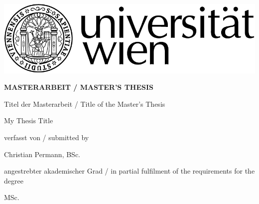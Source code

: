 \begin{titlepage}
\vspace*{-2cm}  %
\begin{flushright}
	\includegraphics[width=.5\textwidth]{titlepage/RZ_Logo_Uni_sw_01.jpg}
\end{flushright}
\vspace{1cm}

\begin{center}  %
    \huge{\textbf{\textsf{\MakeUppercase{
        MASTERARBEIT / MASTER'S THESIS
    }}}}
    \vspace{2cm}

    \large{\textsf{  %
        Titel der Masterarbeit / Title of the Master's Thesis
    }}
    \vspace{.1cm}

    \LARGE{\textsf{  %
        {\glqq}My Thesis Title\grqq
    }}
    \vspace{2cm}

    \large{\textsf{  %
        verfasst von / submitted by
    }}

    \Large{\textsf{  %
        Christian Permann, BSc.
    }}
    \vspace{2cm}

    \large{\textsf{
        angestrebter akademischer Grad / in partial fulfilment of the requirements for the degree  %
    }}

    \Large{\textsf{  %
				MSc.
    }}
\end{center}
\vspace{2cm}


\end{titlepage}
